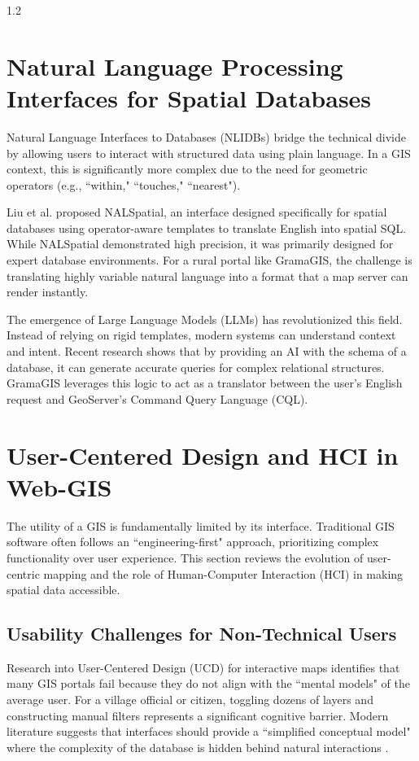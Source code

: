 \begin{spacing}{1.2}
\section{Natural Language Processing Interfaces for Spatial Databases}

Natural Language Interfaces to Databases (NLIDBs) bridge the technical divide by allowing users to interact with structured data using plain language. In a GIS context, this is significantly more complex due to the need for geometric operators (e.g., ``within," ``touches," ``nearest").

Liu et al. \cite{liu2025nalspatial} proposed NALSpatial, an interface designed specifically for spatial databases using operator-aware templates to translate English into spatial SQL. While NALSpatial demonstrated high precision, it was primarily designed for expert database environments. For a rural portal like GramaGIS, the challenge is translating highly variable natural language into a format that a map server can render instantly.

The emergence of Large Language Models (LLMs) has revolutionized this field. Instead of relying on rigid templates, modern systems can understand context and intent. Recent research shows that by providing an AI with the schema of a database, it can generate accurate queries for complex relational structures. GramaGIS leverages this logic to act as a translator between the user’s English request and GeoServer’s Command Query Language (CQL).

\section{User-Centered Design and HCI in Web-GIS}

The utility of a GIS is fundamentally limited by its interface. Traditional GIS software often follows an ``engineering-first" approach, prioritizing complex functionality over user experience. This section reviews the evolution of user-centric mapping and the role of Human-Computer Interaction (HCI) in making spatial data accessible.

\subsection{Usability Challenges for Non-Technical Users}
Research into User-Centered Design (UCD) for interactive maps identifies that many GIS portals fail because they do not align with the ``mental models" of the average user. For a village official or citizen, toggling dozens of layers and constructing manual filters represents a significant cognitive barrier. Modern literature suggests that interfaces should provide a ``simplified conceptual model" where the complexity of the database is hidden behind natural interactions \cite{fu2020webgis}. 


\end{spacing}

